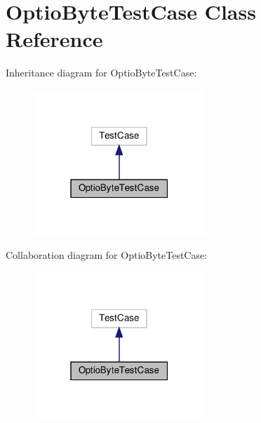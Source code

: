 \hypertarget{classstm__tools_1_1tests_1_1optionbytes__test_1_1OptioByteTestCase}{}\section{Optio\+Byte\+Test\+Case Class Reference}
\label{classstm__tools_1_1tests_1_1optionbytes__test_1_1OptioByteTestCase}


Inheritance diagram for Optio\+Byte\+Test\+Case\+:
\nopagebreak
\begin{figure}[H]
\begin{center}
\leavevmode
\includegraphics[width=183pt]{classstm__tools_1_1tests_1_1optionbytes__test_1_1OptioByteTestCase__inherit__graph}
\end{center}
\end{figure}


Collaboration diagram for Optio\+Byte\+Test\+Case\+:
\nopagebreak
\begin{figure}[H]
\begin{center}
\leavevmode
\includegraphics[width=183pt]{classstm__tools_1_1tests_1_1optionbytes__test_1_1OptioByteTestCase__coll__graph}
\end{center}
\end{figure}
